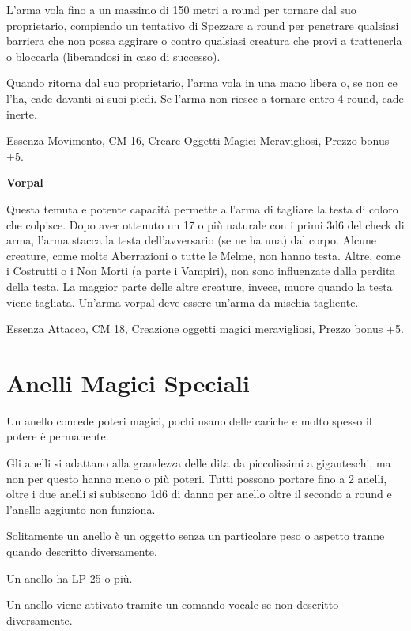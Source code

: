\documentclass[a4paper,11pt,twoside,openany]{book}
\begin{document}
{L'arma vola fino a un massimo di 150 metri a round per tornare dal suo proprietario, compiendo un tentativo di Spezzare a round per penetrare qualsiasi barriera che non possa aggirare o contro qualsiasi creatura che provi a trattenerla o bloccarla (liberandosi in caso di successo). 

Quando ritorna dal suo proprietario, l'arma vola in una mano libera o, se non ce l'ha, cade davanti ai suoi piedi. Se l'arma non riesce a tornare entro 4 round, cade inerte.

Essenza Movimento, CM 16, Creare Oggetti Magici Meravigliosi, Prezzo bonus +5.

\textbf{Vorpal}

Questa temuta e potente capacità permette all'arma di tagliare la testa di coloro che colpisce. Dopo aver ottenuto un 17 o più naturale con i primi 3d6 del check di arma, l'arma stacca la testa dell'avversario (se ne ha una) dal corpo. Alcune creature, come molte Aberrazioni o tutte le Melme, non hanno testa. Altre, come i Costrutti o i Non Morti (a parte i Vampiri), non sono influenzate dalla perdita della testa. La maggior parte delle altre creature, invece, muore quando la testa viene tagliata. Un'arma vorpal deve essere un'arma da mischia tagliente.

Essenza Attacco, CM 18, Creazione oggetti magici meravigliosi, Prezzo bonus +5.

\pagebreak

\section{Anelli Magici Speciali}

\label{anelli-magici-speciali}

Un anello concede poteri magici, pochi usano delle cariche e molto spesso il potere è permanente.

Gli anelli si adattano alla grandezza delle dita da piccolissimi a giganteschi, ma non per questo hanno meno o più poteri. Tutti possono portare fino a 2 anelli, oltre i due anelli si subiscono 1d6 di danno per anello oltre il secondo a round e l'anello aggiunto non funziona.

Solitamente un anello è un oggetto senza un particolare peso o aspetto tranne quando descritto diversamente.

Un anello ha LP 25 o più.

Un anello viene attivato tramite un comando vocale se non descritto diversamente.

}
\end{document}
